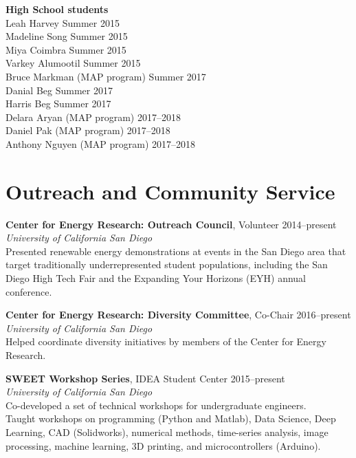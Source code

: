 \documentclass[]{res}
\begin{document}
\begin{resume}
\textbf{High School students} \\
Leah Harvey \hfill Summer 2015 \\
Madeline Song \hfill Summer 2015 \\
Miya Coimbra \hfill Summer 2015 \\
Varkey Alumootil \hfill Summer 2015 \\
Bruce Markman (MAP program) \hfill Summer 2017 \\
Danial Beg \hfill Summer 2017 \\
Harris Beg \hfill Summer 2017 \\
Delara Aryan (MAP program) \hfill 2017--2018 \\
Daniel Pak (MAP program) \hfill 2017--2018 \\
Anthony Nguyen (MAP program) \hfill 2017--2018



\section{Outreach and Community Service}
\vspace{0.1in}
%

\textbf{Center for Energy Research: Outreach Council}, Volunteer \hfill 2014--present \\
\textit{University of California San Diego} \\
Presented renewable energy demonstrations at events in the San Diego area that
target traditionally underrepresented student populations, including the San Diego
High Tech Fair and the Expanding Your Horizons (EYH) annual conference.

\textbf{Center for Energy Research: Diversity Committee}, Co-Chair \hfill 2016--present \\
\textit{University of California San Diego} \\
Helped coordinate diversity initiatives by members of the Center for Energy Research.

\textbf{SWEET Workshop Series}, IDEA Student Center \hfill 2015--present \\
\textit{University of California San Diego} \\
Co-developed a set of technical workshops for undergraduate engineers. \\
Taught workshops on programming (Python and Matlab), Data Science, Deep
Learning, CAD (Solidworks), numerical methods, time-series analysis, image
processing, machine learning, 3D printing, and microcontrollers (Arduino).


\end{resume}
\end{document}

